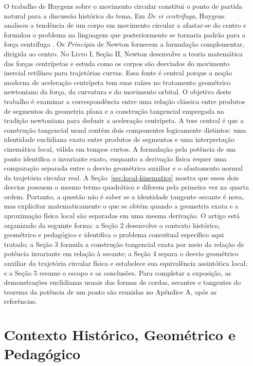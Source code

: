 \documentclass[12pt,a4paper]{article}
\numberwithin{equation}{section}
\theoremstyle{remark}
\begin{document}
O trabalho de Huygens sobre o movimento circular constitui o ponto de partida natural para a discussão histórica do tema. Em \textit{De vi centrifuga}, Huygens analisou a tendência de um corpo em movimento circular a afastar-se do centro e formulou o problema na linguagem que posteriormente se tornaria padrão para a força centrífuga \cite{huygens1888devi, yoder2013catalogue}. Os \textit{Principia} de Newton \cite{newton1729principia} fornecem a formulação complementar, dirigida ao centro. No Livro I, Seção II, Newton desenvolve a teoria matemática das forças centrípetas e estuda como os corpos são desviados do movimento inercial retilíneo para trajetórias curvas. Essa fonte é central porque a noção moderna de aceleração centrípeta tem suas raízes no tratamento geométrico newtoniano da força, da curvatura e do movimento orbital. O objetivo deste trabalho é examinar a correspondência entre uma relação clássica entre produtos de segmentos da geometria plana e a construção tangencial empregada na tradição newtoniana para deduzir a aceleração centrípeta. A tese central é que a construção tangencial usual contém dois componentes logicamente distintos: uma identidade euclidiana exata entre produtos de segmentos e uma interpretação cinemática local, válida em tempos curtos. A formulação pela potência de um ponto identifica o invariante exato, enquanto a derivação física requer uma comparação separada entre o desvio geométrico auxiliar e o afastamento normal da trajetória circular real. A Seção~\ref{sec:local-kinematics} mostra que esses dois desvios possuem o mesmo termo quadrático e diferem pela primeira vez na quarta ordem. Portanto, a questão não é saber se a identidade tangente--secante é nova, mas explicitar matematicamente o que se obtém quando a geometria exata e a aproximação física local são separadas em uma mesma derivação. O artigo está organizado da seguinte forma: a Seção 2 desenvolve o contexto histórico, geométrico e pedagógico e identifica o problema conceitual específico aqui tratado; a Seção 3 formula a construção tangencial exata por meio da relação de potência invariante em relação à secante; a Seção 4 separa o desvio geométrico auxiliar da trajetória circular física e estabelece sua equivalência assintótica local; e a Seção 5 resume o escopo e as conclusões. Para completar a exposição, as demonstrações euclidianas usuais das formas de cordas, secantes e tangentes do teorema da potência de um ponto são reunidas no Apêndice A, após as referências.

\section{Contexto Histórico, Geométrico e Pedagógico}
\label{sec:review}
\end{document}
